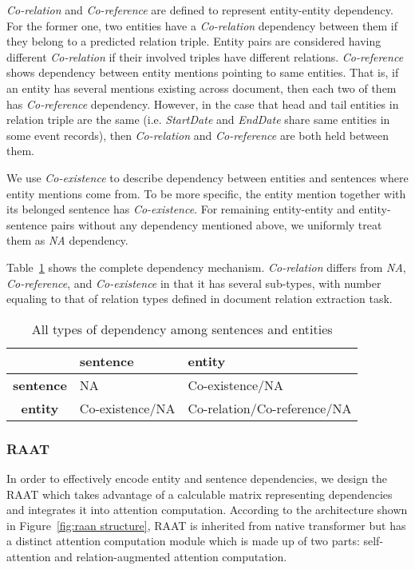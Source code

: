 \documentclass[11pt]{article}
\begin{document}
\textit{Co-relation} and \textit{Co-reference} are defined to represent entity-entity dependency. For the former one, two entities have a \textit{Co-relation} dependency between them if they belong to a predicted relation triple. Entity pairs are considered having different \textit{Co-relation} if their involved triples have different relations. \textit{Co-reference} shows dependency between entity mentions pointing to same entities. That is, if an entity has several mentions existing across document, then each two of them has \textit{Co-reference} dependency. However, in the case that head and tail entities in relation triple are the same (i.e. \textit{StartDate} and \textit{EndDate} share same entities in some event records), then \textit{Co-relation} and \textit{Co-reference} are both held between them.


We use \textit{Co-existence} to describe dependency between entities and sentences where entity mentions come from. To be more specific, the entity mention together with its belonged sentence has \textit{Co-existence}. For remaining entity-entity and entity-sentence pairs without any dependency mentioned above, we uniformly treat them as \textit{NA} dependency. 

Table~\ref{tab:dependency system} shows the complete dependency mechanism. \textit{Co-relation} differs from \textit{NA}, \textit{Co-reference}, and \textit{Co-existence} in that it has several sub-types, with number equaling to that of relation types defined in document relation extraction task.
\begin{table}
    \centering\small
\begin{tabular}{|c|m{7em}|m{7em}|}
    \hline
    & \textbf{sentence} & \textbf{entity} \\
    \hline
    \textbf{sentence} & NA & Co-existence/NA \\
    \hline
    \textbf{entity} & Co-existence/NA & Co-relation/Co-reference/NA \\
    \hline
    \end{tabular}
    \caption{All types of dependency among sentences and entities}
    \label{tab:dependency system}
\end{table}

\subsubsection{RAAT}
In order to effectively encode entity and sentence dependencies, we design the RAAT which takes advantage of a calculable matrix representing dependencies and integrates it into attention computation. According to the architecture shown in Figure~\ref{fig:raan structure}, RAAT is inherited from native transformer but has a distinct attention computation module which is made up of two parts: self-attention and relation-augmented attention computation.
\end{document}
